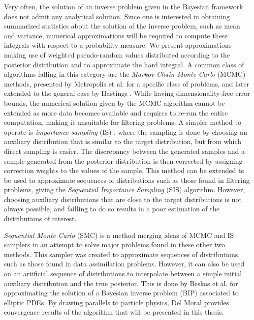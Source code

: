 Very often, the solution of an inverse problem given in the Bayesian framework does not admit any analytical solution. Since one is interested in obtaining summarized statistics about the solution of the inverse problem, such as mean and variance, numerical approximations will be required to compute these integrals with respect to a probability measure. We present approximations making use of weighted pseudo-random values distributed according to the posterior distribution and to approximate the hard integral. A common class of algorithms falling in this category are the \textit{Markov Chain Monte Carlo} (MCMC) methods, presented by Metropolis et al. \cite{metropolis1953equation} for a specific class of problems, and later extended to the general case by Hastings \cite{hastings1970monte}. While having dimensionality-free error bounds, the numerical solution given by the MCMC algorithm cannot be extended as more data becomes available and requires to re-run the entire computation, making it unsuitable for filtering problems. A simpler method to operate is \textit{importance sampling} (IS) \cite{Robert}, where the sampling is done by choosing an auxiliary distribution that is similar to the target distribution, but from which direct sampling is easier. The discrepancy between the generated samples and a sample generated from the posterior distribution is then corrected by assigning correction weights to the values of the sample. This method can be extended to be used to approximate sequences of distributions such as those found in filtering problems, giving the \textit{Sequential Importance Sampling} (SIS) algorithm. However, choosing auxiliary distributions that are close to the target distributions is not always possible, and failling to do so results in a poor estimation of the distributions of interest.

\textit{Sequential Monte Carlo} (SMC) \cite{del_moral_2006} is a method merging ideas of MCMC and IS samplers in an attempt to solve major problems found in these other two methods. This sampler was created to approximate sequences of distributions, such as those found in data assimilation problems. However, it can also be used on an artificial sequence of distributions to interpolate between a simple initial auxiliary distribution and the true posterior. This is done by Beskos et al. \cite{beskos2015sequential} for approximating the solution of a Bayesian inverse problem (BIP) associated to elliptic PDEs. By drawing parallels to particle physics, Del Moral \cite{del2013mean, del2004feynman} provides convergence results of the algorithm that will be presented in this thesis.

